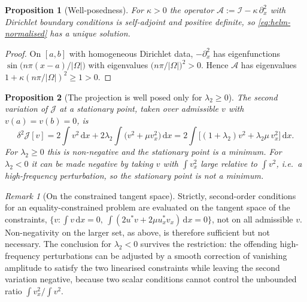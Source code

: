 \documentclass[11pt,a4paper]{article}
\newtheorem{proposition}{Proposition}
\theoremstyle{remark}
\newtheorem{remark}{Remark}
\newcommand{\dx}{\,\mathrm{d}x}
\newcommand{\us}{u^{*}}
\newcommand{\Om}{\Omega}
\begin{document}
\begin{proposition}[Well-posedness]
For $\kappa > 0$ the operator $\mathcal{A} := \mathcal{I} - \kappa\,\partial_x^2$
with Dirichlet boundary conditions is self-adjoint and positive definite, so
\eqref{eq:helm-normalised} has a unique solution.
\end{proposition}

\begin{proof}
On $[a,b]$ with homogeneous Dirichlet data, $-\partial_x^2$ has eigenfunctions
$\sin\!\big(n\pi(x-a)/|\Om|\big)$ with eigenvalues $\big(n\pi/|\Om|\big)^2 > 0$.
Hence $\mathcal{A}$ has eigenvalues $1 + \kappa(n\pi/|\Om|)^2 \geq 1 > 0$.
\end{proof}

\begin{proposition}[The projection is well posed only for $\lambda_2 \geq 0$]
\label{prop:wellposed}
The second variation of $\mathcal{J}$ at a stationary point, taken over
admissible $v$ with $v(a)=v(b)=0$, is
\begin{equation}
\delta^2\mathcal{J}[v]
= 2\int v^2\dx + 2\lambda_2\int\big(v^2 + \mu v_x^2\big)\dx
= 2\int\Big[(1+\lambda_2)v^2 + \lambda_2\mu\,v_x^2\Big]\dx .
\end{equation}
For $\lambda_2 \geq 0$ this is non-negative and the stationary point is a
minimum. For $\lambda_2 < 0$ it can be made negative by taking $v$ with
$\int v_x^2$ large relative to $\int v^2$, i.e.\ a high-frequency perturbation,
so the stationary point is not a minimum.
\end{proposition}

\begin{remark}[On the constrained tangent space]
Strictly, second-order conditions for an equality-constrained problem are
evaluated on the tangent space of the constraints,
$\{v : \int v\dx = 0,\ \int(2\us v + 2\mu\us_x v_x)\dx = 0\}$, not on all
admissible $v$. Non-negativity on the larger set, as above, is therefore
sufficient but not necessary. The conclusion for $\lambda_2 < 0$ survives the
restriction: the offending high-frequency perturbations can be adjusted by a
smooth correction of vanishing amplitude to satisfy the two linearised
constraints while leaving the second variation negative, because two scalar
conditions cannot control the unbounded ratio $\int v_x^2 / \int v^2$.
\end{remark}
\end{document}
